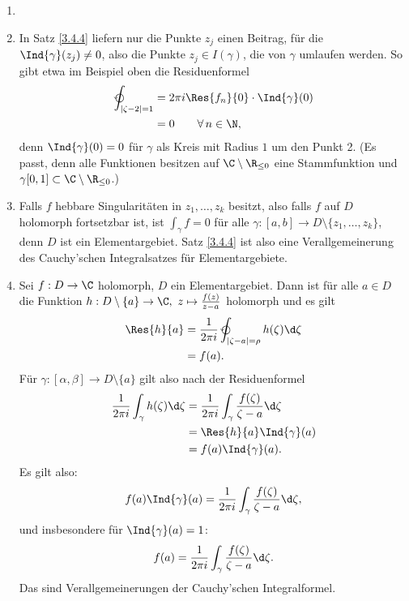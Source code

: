 		\begin{rem}
			\begin{enumerate}[label={\alph*})]
				\item[]
				\item In Satz \ref{3.4.4} liefern nur die Punkte $z_j$ einen Beitrag, für die $\Ind{\gamma}(z_j) \neq 0$, also die Punkte $z_j \in I(\gamma)$, die von $\gamma$ umlaufen werden. So gibt etwa im Beispiel oben die Residuenformel 
				\begin{align*}
					\varointctrclockwise_{|\zeta - 2|=1} &= 2\pi i \Res{f_n}{0} \cdot \Ind{\gamma}(0)\\
					&= 0 \qquad \forall\, n \in \N,
				\end{align*}
				denn $\Ind{\gamma}(0) = 0$ für $\gamma$ als Kreis mit Radius $1$ um den Punkt 2. (Es passt, denn alle Funktionen besitzen auf $\C \setminus\R_{\leq 0}$ eine Stammfunktion und $ \gamma[0,1] \subset \C\setminus\R_{\leq 0} $.)
				\item Falls $f$ hebbare Singularitäten in $z_1,\dotsc,z_k$ besitzt, also falls $f$ auf $D$ holomorph fortsetzbar ist, ist $\int_\gamma f = 0$ für alle $ \gamma:[a,b] \to D \setminus\{z_1,\dotsc,z_k\} $, denn $D$ ist ein Elementargebiet. Satz \ref{3.4.4} ist also eine Verallgemeinerung des Cauchy'schen Integralsatzes für Elementargebiete.
				\item Sei $ f: D \to \C $ holomorph, $D$ ein Elementargebiet. Dann ist für alle $a \in D$ die Funktion $ h: D \setminus\{a\} \to \C,\ z \mapsto \frac{f(z)}{z-a} $ holomorph und es gilt
				\begin{align*}
					\Res{h}{a} &= \frac{1}{2\pi i} \varointctrclockwise_{|\zeta - a| = \rho} h(\zeta)\d\zeta\\
					&= f(a).
				\end{align*}
				Für $ \gamma: [\alpha,\beta] \to D\setminus\{a\} $ gilt also nach der Residuenformel
				\begin{align*}
					\frac{1}{2\pi i} \int_\gamma h(\zeta)\d\zeta &= \frac{1}{2\pi i} \int_\gamma \frac{f(\zeta)}{\zeta-a} \d\zeta\\
					&= \Res{h}{a} \Ind{\gamma}(a)\\
					&= f(a) \Ind{\gamma}(a).
				\end{align*}
				Es gilt also:
				\[ f(a)\Ind{\gamma}(a) = \frac{1}{2\pi i} \int_\gamma \frac{f(\zeta)}{\zeta-a}\d\zeta, \]
				und insbesondere für $\Ind{\gamma}(a) = 1$:
				\[ f(a) = \frac{1}{2\pi i} \int_\gamma \frac{f(\zeta)}{\zeta -a}\d\zeta. \]
				Das sind Verallgemeinerungen der Cauchy'schen Integralformel.
			\end{enumerate}
		\end{rem}
		
